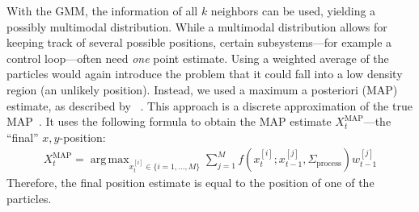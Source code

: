 \documentclass[11pt]{report}
\DeclareMathOperator*{\argmax}{arg\,max}
\begin{document}
With the GMM, the information of all $k$ neighbors can be used,
yielding a possibly multimodal distribution. While a multimodal
distribution allows for keeping track of several possible positions,
certain subsystems---for example a control loop---often need
\emph{one} point estimate. Using a weighted average of the particles
would again introduce the problem that it could fall into a low
density region (an unlikely position). Instead, we used a maximum a
posteriori (MAP) estimate, as described by
\citeauthor{driessen2008map}~\cite{driessen2008map}. This approach is
a discrete approximation of the true MAP~\cite{driessen2008map}. It
uses the following formula to obtain the MAP estimate
$X_t^{\text{MAP}}$---the ``final'' $x,y$-position:
\begin{align*}
X_t^{\text{MAP}} = \argmax_{x_t^{[i]} \in \{i=1,\ldots,M\}} \sum_{j =
  1}^{M}f(x_t^{[i]} ; x_{t-1}^{[j]},\Sigma_{\text{process}})w_{t-1}^{[j]}
\end{align*}
Therefore, the final position estimate is equal to the position of one
of the particles.
\end{document}
